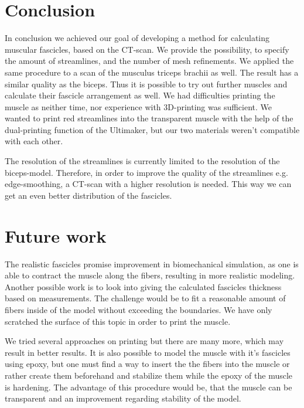\documentclass[preprint,journal]{vgtc}       %
\begin{document}
\section{Conclusion}
In conclusion we achieved our goal of developing a method for calculating muscular fascicles, based on the CT-scan.
We provide the possibility, to specify the amount of streamlines, and the number of mesh refinements. 
We applied the same procedure to a scan of the musculus triceps brachii as well. 
The result has a similar quality as the biceps.
Thus it is possible to try out further muscles and calculate their fascicle arrangement as well.
We had difficulties printing the muscle as neither time, nor experience with 3D-printing was sufficient. 
We wanted to print red streamlines into the transparent muscle with the help of the dual-printing function of the Ultimaker, but our two materials weren't compatible with each other. 

The resolution of the streamlines is currently limited to the resolution of the biceps-model. 
Therefore, in order to improve the quality of the streamlines e.g. edge-smoothing, a CT-scan with a higher resolution is needed. 
This way we can get an even better distribution of the fascicles.

\section{Future work}
The realistic fascicles promise improvement in biomechanical simulation, as one is able to contract the muscle along the fibers, resulting in more realistic modeling. 
Another possible work is to look into giving the calculated fascicles thickness based on measurements. 
The challenge would be to fit a reasonable amount of fibers inside of the model without exceeding the boundaries.
We have only scratched the surface of this topic in order to print the muscle.

We tried several approaches on printing but there are many more, which may result in better results.
It is also possible to model the muscle with it's fascicles using epoxy, but one must find a way to insert the the fibers into the muscle or rather create them beforehand and stabilize them while the epoxy of the muscle is hardening.
The advantage of this procedure would be, that the muscle can be transparent and an improvement regarding stability of the model.



\end{document}
